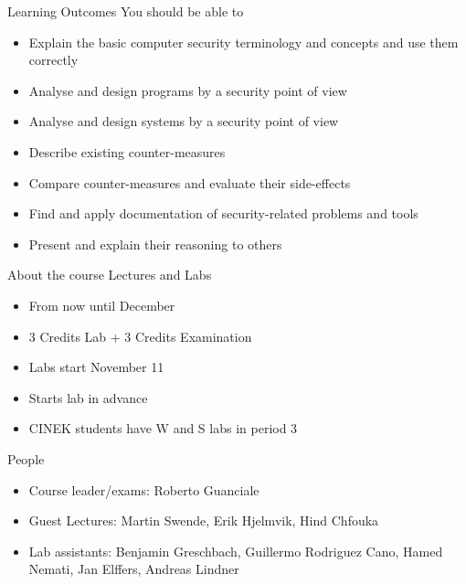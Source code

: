 \documentclass{beamer}
\begin{document}
\begin{frame}{Learning Outcomes}
  You should be able to
  \begin{itemize}
    \item Explain the basic computer security terminology and concepts and use them correctly
    \item Analyse and design programs by a security point of view
    \item Analyse and design systems by a security point of view
    \item Describe existing counter-measures
    \item Compare counter-measures and evaluate their side-effects
    \item Find and apply documentation of security-related problems and tools
    \item Present and explain their reasoning to others
  \end{itemize}
\end{frame}



\begin{frame}{About the course}
  Lectures and Labs
  \begin{itemize}
    \item From now until December
    \item 3 Credits Lab + 3 Credits Examination
    \item Labs start November 11
    \item Starts lab in advance
    \item CINEK students have W and S labs in period 3
  \end{itemize}
\end{frame}


\begin{frame}{People}
  \begin{itemize}
    \item Course leader/exams: Roberto Guanciale
    \item Guest Lectures: 
      Martin Swende,
      Erik Hjelmvik,
      Hind Chfouka
    \item Lab assistants: 
      Benjamin Greschbach,
      Guillermo Rodriguez Cano,
      Hamed Nemati,
      Jan Elffers,
      Andreas Lindner
  \end{itemize}
\end{frame}
\end{document}
